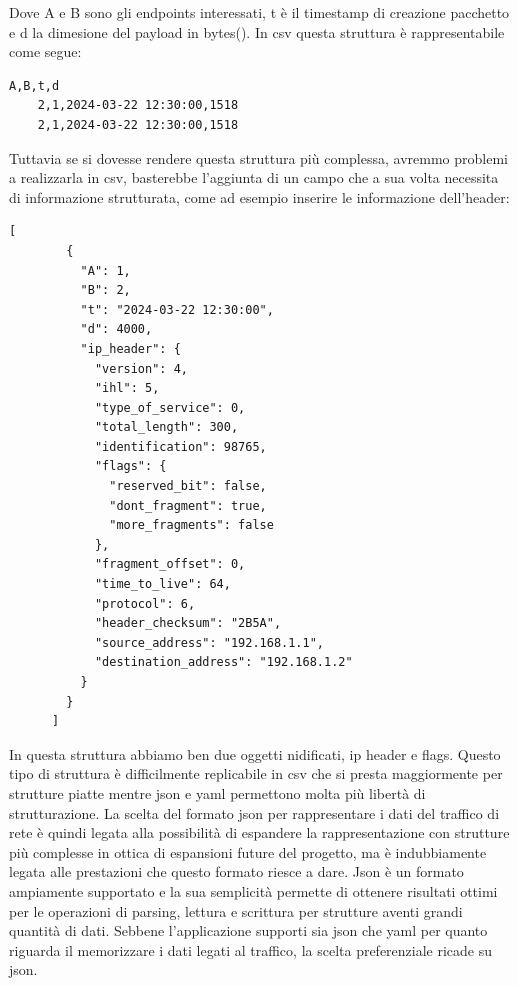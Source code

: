 \documentclass[binding=0.6cm]{sapthesis}
\begin{document}
Dove A e B sono gli endpoints interessati, t è il timestamp di creazione pacchetto e d 
la dimesione del payload in bytes(). In csv questa struttura è rappresentabile come segue:

{\scriptsize %
\begin{lstlisting}[caption={pacchetti di rete rappresentati in csv}]
    A,B,t,d
    2,1,2024-03-22 12:30:00,1518
    2,1,2024-03-22 12:30:00,1518
\end{lstlisting}
}

Tuttavia se si dovesse rendere questa struttura più complessa, avremmo problemi a realizzarla in csv, basterebbe l'aggiunta
di un campo che a sua volta necessita di informazione strutturata, come ad esempio 
inserire le informazione dell'header:
{\scriptsize %
\begin{lstlisting}[caption={pacchetto di rete maggiormente strutturate in json}]
    [
        {
          "A": 1,
          "B": 2,
          "t": "2024-03-22 12:30:00",
          "d": 4000,
          "ip_header": {
            "version": 4,
            "ihl": 5,
            "type_of_service": 0,
            "total_length": 300,
            "identification": 98765,
            "flags": {
              "reserved_bit": false,
              "dont_fragment": true,
              "more_fragments": false
            },
            "fragment_offset": 0,
            "time_to_live": 64,
            "protocol": 6,
            "header_checksum": "2B5A",
            "source_address": "192.168.1.1",
            "destination_address": "192.168.1.2"
          }
        }
      ]
\end{lstlisting}
}
In questa struttura abbiamo ben due oggetti nidificati, ip header e flags. 
Questo tipo di struttura è difficilmente replicabile in csv che si presta maggiormente
per strutture piatte mentre json e yaml permettono molta più libertà di strutturazione.
La scelta del formato json per rappresentare i dati del traffico di rete è quindi legata alla possibilità di espandere la
rappresentazione con strutture più complesse in ottica di espansioni future del progetto, ma è indubbiamente legata alle prestazioni che questo formato riesce a dare.
Json è un formato ampiamente supportato e la sua semplicità permette di ottenere risultati ottimi per le operazioni di parsing, lettura e scrittura per strutture aventi grandi quantità di dati.
Sebbene l'applicazione supporti sia json che yaml per quanto riguarda il memorizzare i dati legati al traffico, la scelta preferenziale ricade su json.
\end{document}
